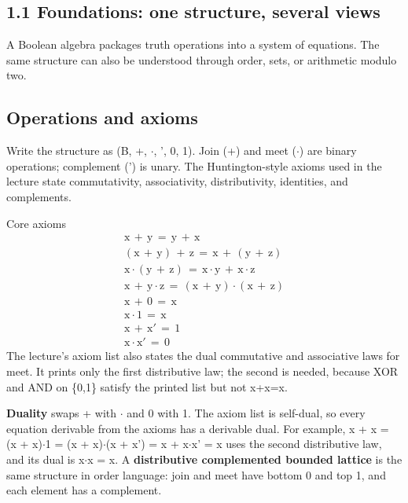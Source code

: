 \documentclass[11pt]{article}
\begin{document}
\begin{keepsection}
\section{1.1 Foundations: one structure, several views}

A Boolean algebra packages truth operations into a system of equations. The same structure can also be understood through order, sets, or arithmetic modulo two.

\begin{keepsection}
\subsection{Operations and axioms}

Write the structure as (B, +, \ensuremath{\cdot}, ', 0, 1). Join (+) and meet (\ensuremath{\cdot}) are binary operations; complement (') is unary. The Huntington-style axioms used in the lecture state commutativity, associativity, distributivity, identities, and complements.

\begin{equationcard}{Core axioms}
\[ \begin{gathered} \mathrm{x}\, +\, \mathrm{y}\, =\, \mathrm{y}\, +\, \mathrm{x} \\ (\mathrm{x}\, +\, \mathrm{y})\, +\, \mathrm{z}\, =\, \mathrm{x}\, +\, (\mathrm{y}\, +\, \mathrm{z}) \\ \mathrm{x}\cdot (\mathrm{y}\, +\, \mathrm{z})\, =\, \mathrm{x}\cdot \mathrm{y}\, +\, \mathrm{x}\cdot \mathrm{z} \\ \mathrm{x}\, +\, \mathrm{y}\cdot \mathrm{z}\, =\, (\mathrm{x}\, +\, \mathrm{y})\cdot (\mathrm{x}\, +\, \mathrm{z}) \\ \mathrm{x}\, +\, 0\, =\, \mathrm{x} \\ \mathrm{x}\cdot 1\, =\, \mathrm{x} \\ \mathrm{x}\, +\, \mathrm{x}'\, =\, 1 \\ \mathrm{x}\cdot \mathrm{x}'\, =\, 0 \end{gathered} \]
{\small The lecture’s axiom list also states the dual commutative and associative laws for meet. It prints only the first distributive law; the second is needed, because XOR and AND on \{0,1\} satisfy the printed list but not x+x=x.}
\end{equationcard}

\textbf{Duality} swaps + with \ensuremath{\cdot} and 0 with 1. The axiom list is self-dual, so every equation derivable from the axioms has a derivable dual. For example, x + x = (x + x)\ensuremath{\cdot}1 = (x + x)\ensuremath{\cdot}(x + x') = x + x\ensuremath{\cdot}x' = x uses the second distributive law, and its dual is x\ensuremath{\cdot}x = x. A \textbf{distributive complemented bounded lattice} is the same structure in order language: join and meet have bottom 0 and top 1, and each element has a complement.


\end{keepsection}
\end{keepsection}
\end{document}

